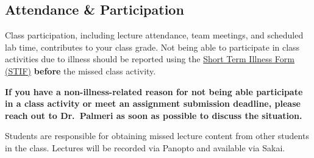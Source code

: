 \subsection*{Attendance \& Participation}
Class participation, including lecture attendance, team meetings, and scheduled
lab time, contributes to your class grade. Not being able to participate in
class activities due to
 illness should be reported using the
\href{http://www.pratt.duke.edu/undergrad/policies/3531}{Short Term Illness
Form (STIF)} \textbf{before} the missed class activity.

\textbf{If you have a non-illness-related reason for not being able participate
in a class activity or meet an assignment submission deadline, please reach out
to Dr.\ Palmeri as soon as possible to discuss the situation.}

Students are responsible for obtaining missed lecture content from other
students in the class.  Lectures will be recorded via Panopto and available via
Sakai.